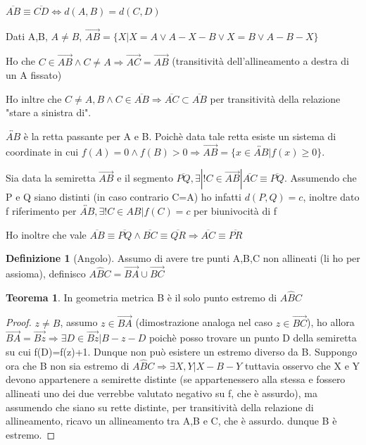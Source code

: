 \documentclass[a4paper,10pt]{article}
\theoremstyle{definition}
\theoremstyle{indentdefinition}
\newtheorem{defn}{Definizione}[section]
\theoremstyle{indentpostulate}
\theoremstyle{indenttheorem}
\newtheorem{thm}{Teorema}[section]
\theoremstyle{myremark}
\theoremstyle{indentgeneral}
\begin{document}
$\overline{AB} \equiv \overline{CD} \iff d(A,B)=d(C,D)$

Dati A,B, $A \neq B$, $\overrightarrow{AB}=\{ X| X=A \lor A-X-B \lor X=B \lor A-B-X \}$

Ho che $C \in \overrightarrow{AB} \land C \neq A \Rightarrow \overrightarrow{AC}=\overrightarrow{AB}$ (transitività dell'allineamento a destra di un A fissato)

Ho inltre che $C \neq A,B \land C \in \overline{AB} \Rightarrow \overline{AC} \subset \overline{AB}$ per transitività della relazione "stare a sinistra di". 

$\overleftrightarrow{AB}$ è la retta passante per A e B. Poichè data tale retta esiste un sistema di coordinate in cui $f(A)=0 \land f(B)>0\Rightarrow \overrightarrow{AB}=\{ 
x \in \overleftrightarrow{AB} | f(x) \geq 0 \}$.

Sia data la semiretta $\overrightarrow{AB}$ e il segmento $\overline{PQ}, \exists |! C \in \overrightarrow{AB}| \overline{AC} \equiv \overline{PQ}$. Assumendo che P e Q siano distinti (in caso contrario C=A) ho infatti $d(P,Q)=c$, inoltre dato f riferimento per $\overleftrightarrow{AB}, \exists ! C \in AB |f(C)=c$ per biunivocità di f

Ho inoltre che vale $\overline{AB} \equiv \overline{PQ} \land \overline{BC} \equiv \overline{QR} \Rightarrow \overline{AC} \equiv \overline{PR}$

\begin{defn}[Angolo]
    Assumo di avere tre punti A,B,C non allineati (li ho per assioma), definisco $A \hat{B} C=\overrightarrow{BA} \cup \overrightarrow{BC}$
\end{defn}


\begin{thm}  In geometria metrica B è il solo punto estremo di $A \hat{B} C$   \end{thm}

\begin{proof}  $z \neq B$, assumo $z \in \overrightarrow{BA}$ (dimostrazione analoga nel caso $z \in \overrightarrow{BC}$), ho allora $\overrightarrow{BA}=\overrightarrow{Bz} \Rightarrow \exists D \in \overrightarrow{Bz}|B-z-D$ poichè posso trovare un punto D della semiretta su cui f(D)=f(z)+1. Dunque non può esistere un estremo diverso da B. Suppongo ora che B non sia estremo di $A\hat{B}C\Rightarrow \exists X,Y|X-B-Y$ tuttavia osservo che X e Y devono appartenere a semirette distinte (se appartenessero alla stessa e fossero allineati uno dei due verrebbe valutato negativo su f, che è assurdo), ma assumendo che siano su rette distinte, per transitività della relazione di allineamento, ricavo un allineamento tra A,B e C, che è assurdo. dunque B è estremo.    \end{proof} 
\end{document}
